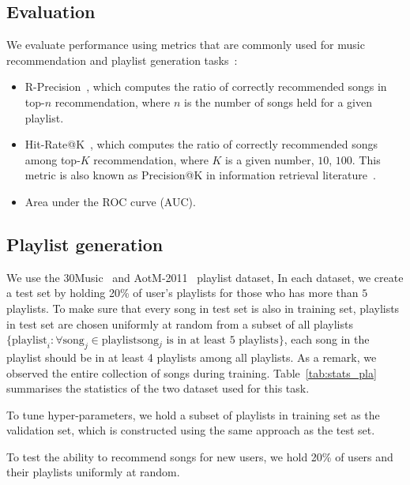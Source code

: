 \subsection{Evaluation}
We evaluate performance using metrics that are commonly used for music recommendation and playlist generation
tasks~\cite{hariri2012context,bonnin2013evaluating,jannach2015beyond,ben2017groove,schedl2017}:
\begin{itemize}
\item R-Precision~\cite{manning2008introIR}, which computes the ratio of correctly recommended songs in top-$n$ recommendation, 
      where $n$ is the number of songs held for a given playlist.
\item Hit-Rate@K~\cite{hariri2012context}, which computes the ratio of correctly recommended songs among top-$K$ recommendation, 
      where $K$ is a given number, \eg $10$, $100$. 
      This metric is also known as Precision@K in information retrieval literature~\cite{manning2008introIR}.
\item Area under the ROC curve (AUC).
\end{itemize}


\subsection{Playlist generation}
\label{ssec:pla}

We use the 30Music~\cite{30music2015} and AotM-2011~\cite{mcfee2012hypergraph} playlist dataset,
In each dataset, we create a test set by holding 20\% of user's playlists for those who has more than $5$ playlists.
To make sure that every song in test set is also in training set, 
playlists in test set are chosen uniformly at random from a subset of all playlists 
$\{\text{playlist}_i: \forall \text{song}_j \in \text{playlist} \text{song$_j$ is in at least $5$ playlists}\}$,
\ie each song in the playlist should be in at least 4 playlists among all playlists.
As a remark, we observed the entire collection of songs during training.
Table~\ref{tab:stats_pla} summarises the statistics of the two dataset used for this task.

To tune hyper-parameters, we hold a subset of playlists in training set as the validation set, 
which is constructed using the same approach as the test set.

To test the ability to recommend songs for new users, we hold 20\% of users and their playlists uniformly at random.

